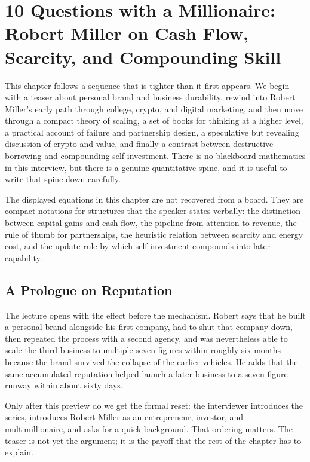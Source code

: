 \chapter{10 Questions with a Millionaire: Robert Miller on Cash Flow, Scarcity, and Compounding Skill}

This chapter follows a sequence that is tighter than it first appears. We begin with a teaser about personal brand and business durability, rewind into Robert Miller's early path through college, crypto, and digital marketing, and then move through a compact theory of scaling, a set of books for thinking at a higher level, a practical account of failure and partnership design, a speculative but revealing discussion of crypto and value, and finally a contrast between destructive borrowing and compounding self-investment. There is no blackboard mathematics in this interview, but there is a genuine quantitative spine, and it is useful to write that spine down carefully.

\begin{remark}
The displayed equations in this chapter are not recovered from a board. They are compact notations for structures that the speaker states verbally: the distinction between capital gains and cash flow, the pipeline from attention to revenue, the rule of thumb for partnerships, the heuristic relation between scarcity and energy cost, and the update rule by which self-investment compounds into later capability.
\end{remark}

\section{A Prologue on Reputation}

The lecture opens with the effect before the mechanism. Robert says that he built a personal brand alongside his first company, had to shut that company down, then repeated the process with a second agency, and was nevertheless able to scale the third business to multiple seven figures within roughly six months because the brand survived the collapse of the earlier vehicles. He adds that the same accumulated reputation helped launch a later business to a seven-figure runway within about sixty days.

Only after this preview do we get the formal reset: the interviewer introduces the series, introduces Robert Miller as an entrepreneur, investor, and multimillionaire, and asks for a quick background. That ordering matters. The teaser is not yet the argument; it is the payoff that the rest of the chapter has to explain.

